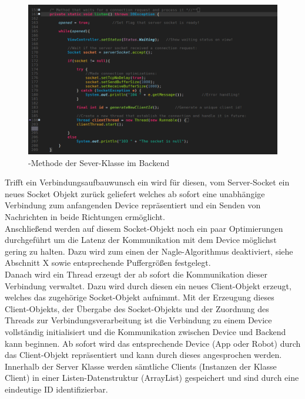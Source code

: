 \begin{figure}[ht]
	\centering
	\includegraphics[width=1.0\textwidth]{images/implementation/SeverListenMethod.png}
	\caption[-Methode der Sever-Klasse im Backend]{-Methode der Sever-Klasse im Backend}
\end{figure}
Trifft ein Verbindungsaufbauwunsch ein wird für diesen, vom Server-Socket ein neues Socket Objekt zurück geliefert welches 
ab sofort eine unabhängige Verbindung zum anfangenden Device repräsentiert und ein Senden von Nachrichten in beide Richtungen 
ermöglicht.\\
Anschließend werden auf diesem Socket-Objekt noch ein paar Optimierungen durchgeführt um die Latenz der Kommunikation mit dem
Device möglichst gering zu halten. Dazu wird zum einen der Nagle-Algorithmus deaktiviert, siehe Abschnitt X sowie entsprechende
Puffergrößen festgelegt. \\
Danach wird ein Thread erzeugt der ab sofort die Kommunikation dieser Verbindung verwaltet. Dazu wird durch diesen ein neues Client-Objekt 
erzeugt, welches das zugehörige Socket-Objekt aufnimmt. Mit der Erzeugung dieses Client-Objekts, der Übergabe des Socket-Objekts und
der Zuordnung des Threads zur Verbindungsverarbeitung ist die Verbindung zu einem Device vollständig initialisiert und die Kommunikation 
zwischen Device und Backend kann beginnen. 
Ab sofort wird das entsprechende Device (App oder Robot) durch das Client-Objekt repräsentiert und kann durch dieses angesprochen werden. 
Innerhalb der Server Klasse werden sämtliche Clients (Instanzen der Klasse Client) in einer Listen-Datenstruktur (ArrayList) gespeichert 
und sind durch eine eindeutige ID identifizierbar.
